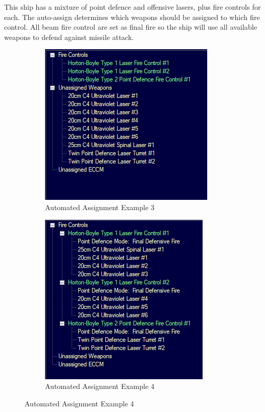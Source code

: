 \documentclass[../../Aurora C# unofficial manual.tex]{subfiles}
\begin{document}
	This ship has a mixture of point defence and offensive lasers, plus fire controls for each. The auto-assign determines which weapons should be assigned to which fire control. All beam fire control are set as final fire so the ship will use all available weapons to defend against missile attack.
	\begin{figure}[H]
		\centering
		\begin{subfigure}{.5\textwidth}
			\centering
			\includegraphics[width=0.5\linewidth]{images/AutomatedAssignment3}
			\caption[Automated Assignment]{Automated Assignment Example 3}
			\label{fig:automatedassignment3}
		\end{subfigure}%
		\begin{subfigure}{.5\textwidth}
			\centering
			\includegraphics[width=0.5\linewidth]{images/AutomatedAssignment4}
			\caption[Automated Assignment]{Automated Assignment Example 4}
			\label{fig:automatedassignment4}
		\end{subfigure}
	\end{figure}
	
\end{document}
